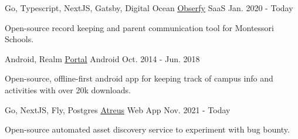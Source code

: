 

\begin{cventries}

  \cventry
  {Go, Typescript, NextJS, Gatsby, Digital Ocean} %
  {\underline{\href{https://github.com/obserfy/obserfy}{Obserfy}}} %
  {SaaS} %
  {Jan. 2020 - Today} %
  {
    \begin{cvitems} %
      \item {Open-source record keeping and parent communication tool for Montessori Schools.}
    \end{cvitems}
  }

  \cventry
  {Android, Realm} %
  {\underline{\href{https://github.com/chrsep/Kingfish}{Portal}}} %
  {Android} %
  {Oct. 2014 - Jun. 2018} %
  {
    \begin{cvitems} %
      \item {Open-source, offline-first android app for keeping track of campus info and activities with over 20k downloads.}
    \end{cvitems}
  }


  \cventry
  {Go, NextJS, Fly, Postgres} %
  {\underline{\href{https://github.com/chrsep/atreus}{Atreus}}} %
  {Web App} %
  {Nov. 2021 - Today} %
  {
    \begin{cvitems} %
      \item {Open-source automated asset discovery service to experiment with bug bounty.}
    \end{cvitems}
  }


\end{cventries}

